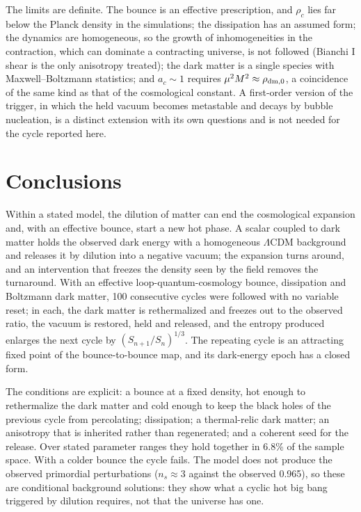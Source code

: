 \documentclass[11pt,a4paper]{article}
\begin{document}
The limits are definite. The bounce is an effective prescription, and $\rho_c$ lies far below the Planck density in the simulations; the dissipation has an assumed form; the dynamics are homogeneous, so the growth of inhomogeneities in the contraction, which can dominate a contracting universe, is not followed (Bianchi I shear is the only anisotropy treated); the dark matter is a single species with Maxwell--Boltzmann statistics; and $a_c\sim1$ requires $\mu^2M^2\approx\rho_{\rm dm,0}$, a coincidence of the same kind as that of the cosmological constant. A first-order version of the trigger, in which the held vacuum becomes metastable and decays by bubble nucleation, is a distinct extension with its own questions and is not needed for the cycle reported here.

\section{Conclusions}
Within a stated model, the dilution of matter can end the cosmological expansion and, with an effective bounce, start a new hot phase. A scalar coupled to dark matter holds the observed dark energy with a homogeneous $\Lambda$CDM background and releases it by dilution into a negative vacuum; the expansion turns around, and an intervention that freezes the density seen by the field removes the turnaround. With an effective loop-quantum-cosmology bounce, dissipation and Boltzmann dark matter, 100 consecutive cycles were followed with no variable reset; in each, the dark matter is rethermalized and freezes out to the observed ratio, the vacuum is restored, held and released, and the entropy produced enlarges the next cycle by $(S_{n+1}/S_n)^{1/3}$. The repeating cycle is an attracting fixed point of the bounce-to-bounce map, and its dark-energy epoch has a closed form.

The conditions are explicit: a bounce at a fixed density, hot enough to rethermalize the dark matter and cold enough to keep the black holes of the previous cycle from percolating; dissipation; a thermal-relic dark matter; an anisotropy that is inherited rather than regenerated; and a coherent seed for the release. Over stated parameter ranges they hold together in 6.8\% of the sample space. With a colder bounce the cycle fails. The model does not produce the observed primordial perturbations ($n_s\approx3$ against the observed 0.965), so these are conditional background solutions: they show what a cyclic hot big bang triggered by dilution requires, not that the universe has one.
\end{document}
